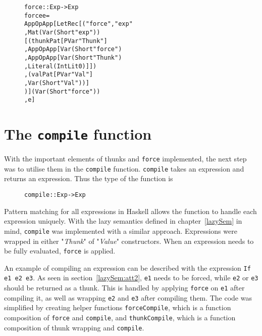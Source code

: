 \begin{figure}[H]
\begin{alltt}
force :: Exp -> Exp
force e =
  App OpApp [LetRec [("force", "exp"
                     , Mat (Var (Short "exp"))
                       [(thunkPat [PVar "Thunk"]
                        , App OpApp [Var (Short "force")
                                    , App OpApp [Var (Short "Thunk")
                                                , Literal (IntLit 0)]])
                       ,(valPat [PVar "Val"]
                        , Var (Short "Val"))]
                     )] (Var (Short "force"))
            , e]
\end{alltt}
\end{figure}


\section{The \texttt{compile} function}
With the important elements of thunks and \texttt{force} implemented, the next
step was to utilise them in the \texttt{compile} function. 
\texttt{compile} takes an expression and returns an expression. Thus the type of
the function is

\begin{figure}[H]
\begin{alltt}
  compile :: Exp -> Exp
\end{alltt}
\end{figure}

\noindent Pattern matching for all expressions in Haskell allows the function to
handle each expression uniquely. With the lazy semantics defined in
chapter~\ref{lazySem} in mind, \texttt{compile} was implemented with a similar
approach. Expressions were wrapped in either "\textit{Thunk}" of
"\textit{Value}" constructors. When an expression needs to be fully evaluated,
\texttt{force} is applied.

An example of compiling an expression can be described with the expression
\texttt{If e1 e2 e3}. As seen in section~\ref{lazySem:att2}, \texttt{e1} needs
to be forced, while \texttt{e2} or \texttt{e3} should be returned as a thunk.
This is handled by applying \texttt{force} on \texttt{e1} after compiling it,
as well as wrapping \texttt{e2} and \texttt{e3} after compiling them.
The code was simplified by creating helper functions \texttt{forceCompile},
which is a function composition of \texttt{force} and \texttt{compile}, and
\texttt{thunkCompile}, which is a function composition of thunk wrapping and
\texttt{compile}.

